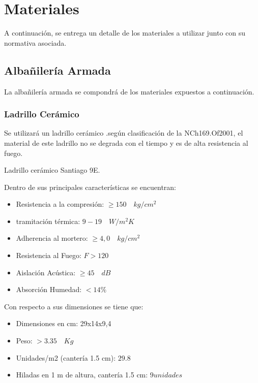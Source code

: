 \newpage
\section{Materiales}
A continuación, se entrega un detalle de los materiales a utilizar junto con su normativa asociada.
    \subsection{Albañilería Armada}
    La albañilería armada se compondrá de los materiales expuestos a continuación.
        \subsubsection{Ladrillo Cerámico}
        Se utilizará un ladrillo cerámico .según clasificación de la NCh169.Of2001, el material de este ladrillo no se degrada con el tiempo y es de alta resistencia al fuego.\\
        \begin{images}[\label{imagenmultiple}]{Ladrillo cerámico Santiago 9E.}
        \end{images}
        
        Dentro de sus principales características se encuentran:
        \begin{itemize}
            \item Resistencia a la compresión: $\geq 150 \quad kg/cm^2$
            \item tramitación térmica: $9-19 \quad W/m^{2}K$
            \item Adherencia al mortero: $\geq4,0 \quad kg/cm^2$
            \item Resistencia al Fuego: $F > 120$
            \item Aislación Acústica: $\geq 45\quad dB$ %
            \item Absorción Humedad: $ < 14\%$
        \end{itemize}
        
        Con respecto a sus dimensiones se tiene que:
        \begin{itemize}
            \item Dimensiones en cm: 29x14x9,4
            \item Peso: $>3.35\quad Kg$
            \item Unidades/m2 (cantería 1.5 cm): $29.8$
            \item Hiladas en 1 m de altura, cantería 1.5 cm: $9 unidades$ 
        \end{itemize}
        
